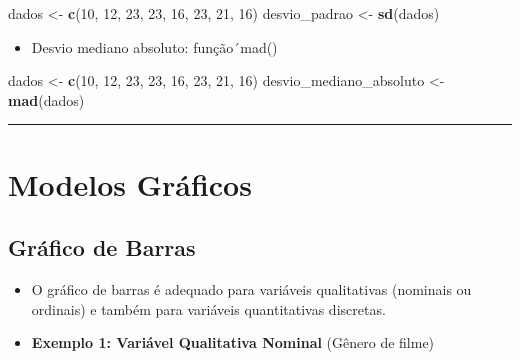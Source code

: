 \documentclass[
]{book}
\newenvironment{Shaded}{\begin{snugshade}}{\end{snugshade}}
\newcommand{\DecValTok}[1]{\textcolor[rgb]{0.00,0.00,0.81}{#1}}
\newcommand{\FunctionTok}[1]{\textcolor[rgb]{0.13,0.29,0.53}{\textbf{#1}}}
\newcommand{\NormalTok}[1]{#1}
\newcommand{\OtherTok}[1]{\textcolor[rgb]{0.56,0.35,0.01}{#1}}
\providecommand{\tightlist}{%
  \setlength{\itemsep}{0pt}\setlength{\parskip}{0pt}}
\begin{document}
\begin{Shaded}
\begin{Highlighting}[]
\NormalTok{dados }\OtherTok{\textless{}{-}} \FunctionTok{c}\NormalTok{(}\DecValTok{10}\NormalTok{, }\DecValTok{12}\NormalTok{, }\DecValTok{23}\NormalTok{, }\DecValTok{23}\NormalTok{, }\DecValTok{16}\NormalTok{, }\DecValTok{23}\NormalTok{, }\DecValTok{21}\NormalTok{, }\DecValTok{16}\NormalTok{)}
\NormalTok{desvio\_padrao }\OtherTok{\textless{}{-}} \FunctionTok{sd}\NormalTok{(dados)}
\end{Highlighting}
\end{Shaded}

\begin{itemize}
\tightlist
\item
  Desvio mediano absoluto: função´mad()
\end{itemize}

\begin{Shaded}
\begin{Highlighting}[]
\NormalTok{dados }\OtherTok{\textless{}{-}} \FunctionTok{c}\NormalTok{(}\DecValTok{10}\NormalTok{, }\DecValTok{12}\NormalTok{, }\DecValTok{23}\NormalTok{, }\DecValTok{23}\NormalTok{, }\DecValTok{16}\NormalTok{, }\DecValTok{23}\NormalTok{, }\DecValTok{21}\NormalTok{, }\DecValTok{16}\NormalTok{)}
\NormalTok{desvio\_mediano\_absoluto }\OtherTok{\textless{}{-}} \FunctionTok{mad}\NormalTok{(dados)}
\end{Highlighting}
\end{Shaded}

\begin{center}\rule{0.5\linewidth}{0.5pt}\end{center}

\chapter{Modelos Gráficos}\label{modelos_graficos6}

\section{Gráfico de Barras}\label{gruxe1fico-de-barras}

\begin{itemize}
\item
  O gráfico de barras é adequado para variáveis qualitativas (nominais ou ordinais) e também para variáveis quantitativas discretas.
\item
  \textbf{Exemplo 1: Variável Qualitativa Nominal} (Gênero de filme)
\end{itemize}
\end{document}
